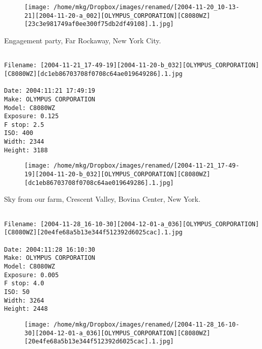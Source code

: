 \begin{figure}
\texttt{[image: /home/mkg/Dropbox/images/renamed/[2004-11-20\_10-13-21][2004-11-20-a\_002][OLYMPUS\_CORPORATION][C8080WZ][23c3e981749af0ee300f75db2df49108].1.jpg]}
\end{figure}
    
\clearpage
\onecolumn
\noindent Engagement party, Far Rockaway, New York City.
\noindent
\begin{lstlisting}

Filename: [2004-11-21_17-49-19][2004-11-20-b_032][OLYMPUS_CORPORATION][C8080WZ][dc1eb86703708f0708c64ae019649286].1.jpg

Date: 2004:11:21 17:49:19
Make: OLYMPUS CORPORATION
Model: C8080WZ
Exposure: 0.125
F stop: 2.5
ISO: 400
Width: 2344
Height: 3188
\end{lstlisting}
\clearpage

\begin{figure}
\texttt{[image: /home/mkg/Dropbox/images/renamed/[2004-11-21\_17-49-19][2004-11-20-b\_032][OLYMPUS\_CORPORATION][C8080WZ][dc1eb86703708f0708c64ae019649286].1.jpg]}
\end{figure}
    
\clearpage
\onecolumn
\noindent Sky from our farm, Crescent Valley, Bovina Center, New York.
\noindent
\begin{lstlisting}

Filename: [2004-11-28_16-10-30][2004-12-01-a_036][OLYMPUS_CORPORATION][C8080WZ][20e4fe68a5b13e344f512392d6025cac].1.jpg

Date: 2004:11:28 16:10:30
Make: OLYMPUS CORPORATION
Model: C8080WZ
Exposure: 0.005
F stop: 4.0
ISO: 50
Width: 3264
Height: 2448
\end{lstlisting}
\clearpage

\begin{figure}
\texttt{[image: /home/mkg/Dropbox/images/renamed/[2004-11-28\_16-10-30][2004-12-01-a\_036][OLYMPUS\_CORPORATION][C8080WZ][20e4fe68a5b13e344f512392d6025cac].1.jpg]}
\end{figure}
    
